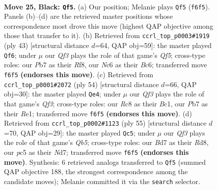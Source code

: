 \documentclass[11pt]{article}
\begin{document}
\clearpage

\begin{figure}[p]\centering
\begin{subfigure}{0.46\textwidth}\centering
\resizebox{\linewidth}{!}{%
\newchessgame
\chessboard[
  setfen={1rr3k1/1p1b1ppp/2n1pq2/2Pp3P/p2P4/P1P2N2/R2QBPP1/2R2K2 b - - 8 25},
  showmover=false,
  pgfstyle=straightmove, color=movearrow, markmove={f6-f5}
]}
\caption{}
\end{subfigure}\hfill
\begin{subfigure}{0.46\textwidth}\centering
\resizebox{\linewidth}{!}{%
\newchessgame
\chessboard[
  setfen={1r3r2/1p3pk1/2bpn1p1/4p2p/p1P1Pq1P/3B1P2/PPN3P1/1K1RQ2R b - - 7 22},
  showmover=false,
  pgfstyle=straightmove, color=movearrow, markmove={f4-f6}
]}
\caption{}
\end{subfigure}
\\[4pt]
\begin{subfigure}{0.46\textwidth}\centering
\resizebox{\linewidth}{!}{%
\newchessgame
\chessboard[
  setfen={4rbk1/p2r1q2/P1p1npp1/2p1p2p/7P/2PPNQ2/1P3PP1/2BRR1K1 w - - 3 28},
  showmover=false,
  pgfstyle=straightmove, color=movearrow, markmove={f3-e4}
]}
\caption{}
\end{subfigure}\hfill
\begin{subfigure}{0.46\textwidth}\centering
\resizebox{\linewidth}{!}{%
\newchessgame
\chessboard[
  setfen={3r2r1/1p1npbk1/3p1pp1/p6p/PqP1P2P/1PN1R3/1Q3PP1/1R3BK1 b - - 3 28},
  showmover=false,
  pgfstyle=straightmove, color=movearrow, markmove={b4-c5}
]}
\caption{}
\end{subfigure}
\caption{\textbf{Move 25, Black: \texttt{Qf5}.} (a) Our position; Melanie plays \texttt{Qf5} (\texttt{f6f5}). Panels (b)--(d) are the retrieved master positions whose correspondence most drove this move (highest QAP objective among those that transfer to it). (b) Retrieved from \texttt{ccrl\_top\_p0003\#1919} (ply 43) [structural distance $d$=64, QAP obj=59]: the master played \texttt{Qf6}; under $\mu$ our \emph{Qf3} plays the role of that game's \emph{Qf5}; cross-type roles: our \emph{P}b7 as their \emph{R}f8, our \emph{N}c6 as their \emph{B}c6; transferred move \texttt{f6f5} \textbf{(endorses this move)}. (c) Retrieved from \texttt{ccrl\_top\_p0001\#2072} (ply 54) [structural distance $d$=66, QAP obj=30]: the master played \texttt{Qe4}; under $\mu$ our \emph{Qf3} plays the role of that game's \emph{Qf3}; cross-type roles: our \emph{R}c8 as their \emph{B}c1, our \emph{P}b7 as their \emph{R}e1; transferred move \texttt{f6f5} \textbf{(endorses this move)}. (d) Retrieved from \texttt{ccrl\_top\_p0002\#1123} (ply 55) [structural distance $d$=70, QAP obj=29]: the master played \texttt{Qc5}; under $\mu$ our \emph{Qf3} plays the role of that game's \emph{Qb5}; cross-type roles: our \emph{B}d7 as their \emph{R}d8, our \emph{p}c5 as their \emph{N}d7; transferred move \texttt{f6f5} \textbf{(endorses this move)}. Synthesis: 6 retrieved analogs transferred to \texttt{Qf5} (summed QAP objective 188, the strongest correspondence among the candidate moves); Melanie committed it via the \texttt{search} selector.}
\label{fig:thought-m49}
\end{figure}
\end{document}
